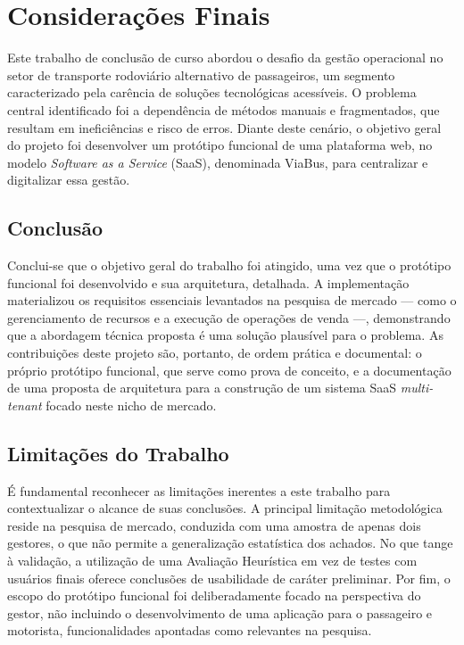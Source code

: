 \chapter{Considerações Finais}
\label{cha:consideracoes_finais}

Este trabalho de conclusão de curso abordou o desafio da gestão operacional no setor de transporte rodoviário alternativo de passageiros, um segmento caracterizado pela carência de soluções tecnológicas acessíveis. O problema central identificado foi a dependência de métodos manuais e fragmentados, que resultam em ineficiências e risco de erros. Diante deste cenário, o objetivo geral do projeto foi desenvolver um protótipo funcional de uma plataforma web, no modelo \textit{Software as a Service} (SaaS), denominada ViaBus, para centralizar e digitalizar essa gestão.

\section{Conclusão}

Conclui-se que o objetivo geral do trabalho foi atingido, uma vez que o protótipo funcional foi desenvolvido e sua arquitetura, detalhada. A implementação materializou os requisitos essenciais levantados na pesquisa de mercado — como o gerenciamento de recursos e a execução de operações de venda —, demonstrando que a abordagem técnica proposta é uma solução plausível para o problema. As contribuições deste projeto são, portanto, de ordem prática e documental: o próprio protótipo funcional, que serve como prova de conceito, e a documentação de uma proposta de arquitetura para a construção de um sistema SaaS \textit{multi-tenant} focado neste nicho de mercado.

\section{Limitações do Trabalho}

É fundamental reconhecer as limitações inerentes a este trabalho para contextualizar o alcance de suas conclusões. A principal limitação metodológica reside na pesquisa de mercado, conduzida com uma amostra de apenas dois gestores, o que não permite a generalização estatística dos achados. No que tange à validação, a utilização de uma Avaliação Heurística em vez de testes com usuários finais oferece conclusões de usabilidade de caráter preliminar. Por fim, o escopo do protótipo funcional foi deliberadamente focado na perspectiva do gestor, não incluindo o desenvolvimento de uma aplicação para o passageiro e motorista, funcionalidades apontadas como relevantes na pesquisa.

